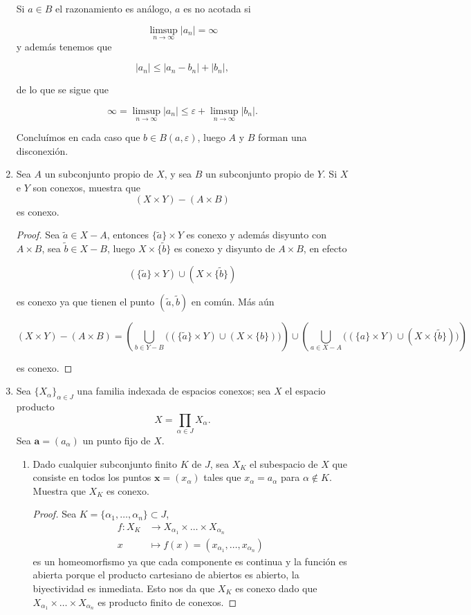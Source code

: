 \documentclass[12bpt]{article}
\begin{document}
\begin{enumerate}
Si $a\in B$ el razonamiento es análogo, $a$ es no acotada si

$$\limsup_{n \to \infty}|a_n|=\infty$$
 y además tenemos que 

 $$|a_n|\leq |a_n-b_n|+|b_n|,$$

 de lo que se sigue que

 $$\infty=\limsup_{n \to \infty} |a_n|\leq \varepsilon +\limsup_{n \to \infty} |b_n|.$$

Concluímos en cada caso que $b\in B(a,\varepsilon)$, luego $A$ y $B$ forman una disconexión.

\item Sea $A$ un subconjunto propio de $X$, y sea $B$ un subconjunto propio de $Y$. Si $X$ e $Y$ son conexos, muestra que
    \[
    (X \times Y) - (A \times B)
    \]
    es conexo.

\begin{proof}
    Sea $\tilde{a}\in X-A$, entonces $\{\tilde{a}\}\times Y$ es conexo y además disyunto con $A\times B$, sea $\tilde{b}\in X-B$, luego $X\times \{\tilde{b}\}$ es conexo  y disyunto de $A\times B$, en efecto 

    $$(\{\tilde{a}\}\times Y)\cup (X\times \{\tilde{b}\})$$

es conexo ya que tienen el punto $(\tilde{a},\tilde{b})$ en común. Más aún

$$(X\times Y)-(A\times B)=\left(\bigcup_{b\in Y-B}\big((\{\tilde{a}\}\times Y)\cup (X\times \{b\})\big)\right) \cup \left(\bigcup_{a\in X-A}\big((\{a\}\times Y)\cup(X\times \{\tilde{b}\}) \big)\right) 
$$

es conexo.
\end{proof}

    \item Sea $\{X_\alpha\}_{\alpha \in J}$ una familia indexada de espacios conexos; sea $X$ el espacio producto
    \[
    X = \prod_{\alpha \in J} X_\alpha.
    \]
    Sea $\mathbf{a} = (a_\alpha)$ un punto fijo de $X$.
    \begin{enumerate}
        \item Dado cualquier subconjunto finito $K$ de $J$, sea $X_K$ el subespacio de $X$ que consiste en todos los puntos $\mathbf{x} = (x_\alpha)$ tales que $x_\alpha = a_\alpha$ para $\alpha \notin K$. Muestra que $X_K$ es conexo.

        \begin{proof}
            Sea $K=\{\alpha_1,\ldots,\alpha_n\}\subset J$,
                \begin{align*}
                    f : X_K &\longrightarrow X_{\alpha_1}\times\ldots\times X_{\alpha_n} \\
                    x &\longmapsto f(x) = (x_{\alpha_1},\ldots,x_{\alpha_n})
                \end{align*}
es un homeomorfismo ya que cada componente es continua y la función es abierta porque el producto cartesiano de abiertos es abierto, la biyectividad es inmediata. Esto nos da que $X_K$ es conexo dado que $X_{\alpha_1}\times\ldots\times X_{\alpha_n}$ es producto finito de conexos.


\end{proof}
\end{enumerate}
\end{enumerate}
\end{document}
